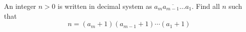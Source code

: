 An integer $n > 0$ is written in decimal system as $\overline{a_ma_{m-1}\ldots a_1}$. Find all $n$ such that\[n=(a_m+1)(a_{m-1}+1)\cdots (a_1+1)\]
